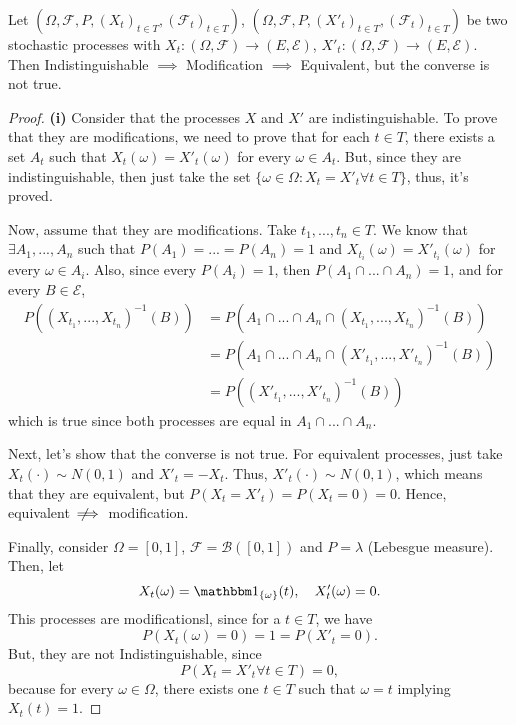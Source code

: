 \begin{proposition}
	Let
	$(\Omega, \mathcal F, P, (X_t)_{t \in T}, (\mathcal F_t)_{t\in T})$,
	$(\Omega, \mathcal F, P, (X'_t)_{t \in T}, (\mathcal F_t)_{t\in T})$
	be two stochastic processes with $X_t:(\Omega, \mathcal F) \to (E,\mathcal E)$,
	$X'_t:(\Omega, \mathcal F) \to (E,\mathcal E)$. Then
	Indistinguishable $\implies$ Modification $\implies$ Equivalent,
	but the converse is not true.
\end{proposition}

\begin{proof}
	\textbf{(i)} Consider that the processes $X$ and $X'$ are indistinguishable.
	To prove that they are modifications, we need to prove that for each $t\in T$,
	there exists a set $A_t$ such that $X_t(\omega) = X'_t(\omega)$ for every $\omega \in A_t$.
	But, since they are indistinguishable, then just take the set
	$\{\omega \in \Omega : X_t = X'_t \forall t \in T\}$, thus, it's proved.

	Now, assume that they are modifications. Take $t_1,...,t_n \in T$.
	We know that $\exists A_1,...,A_n$ such that $P(A_1)=...=P(A_n) = 1$
	and $X_{t_i}(\omega) = X'_{t_i}(\omega)$ for every $\omega \in A_i$.
	Also, since every $P(A_i)=1$, then $P(A_1 \cap ... \cap A_n) = 1$,
	and for every $B \in \mathcal E$,
	\begin{align*}
		P((X_{t_1},...,X_{t_n})^{-1}(B)) & =
		P(A_1 \cap ... \cap A_n \cap (X_{t_1},...,X_{t_n})^{-1}(B))   \\ &=
		P(A_1 \cap ... \cap A_n \cap (X'_{t_1},...,X'_{t_n})^{-1}(B)) \\
		                                 & =
		P((X'_{t_1},...,X'_{t_n})^{-1}(B))
	\end{align*}
	which is true since both processes are equal in
	$A_1\cap...\cap A_n$.

	Next, let's show that the converse is not true. For equivalent
	processes, just take $X_t(\cdot) \sim N(0,1)$ and
	$X'_t = - X_t$. Thus, $X'_t(\cdot) \sim N(0,1)$, which means that
	they are equivalent, but $P(X_t = X'_t) = P(X_t = 0) = 0$.
	Hence, equivalent $\ \not\!\!\!\implies$ modification.

	Finally, consider $\Omega = [0,1]$, $\mathcal F = \mathcal B([0,1])$ and
	$P = \lambda$ (Lebesgue measure). Then, let
	\begin{displaymath}
		X_t(\omega) = \mathbbm 1_{\{\omega\}}(t), \quad X_t'(\omega) = 0.
	\end{displaymath}
	This processes are modificationsl, since
	for a $t \in T$, we have
	\begin{displaymath}
		P(X_t(\omega) = 0) = 1 = P(X'_t = 0).
	\end{displaymath}
	But, they are not Indistinguishable, since
	\begin{displaymath}
		P(X_t = X'_t \forall t \in T) = 0,
	\end{displaymath}
	because for every $\omega \in \Omega$, there exists
	one $t \in T$ such that $\omega = t$ implying $X_t(t) = 1$.

\end{proof}


